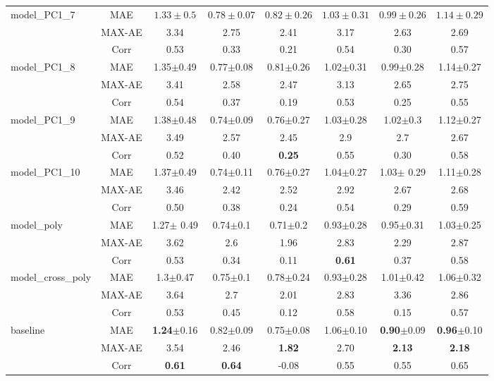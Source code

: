 \begin{table}[t]
\begin{center}
\begin{tabular}{lc||c|c|c|c|c|c}
			\hline
			model\_PC1\_7&MAE &$1.33\pm{0.5}$&$0.78\pm{0.07}$&$0.82\pm{0.26}$&$1.03\pm{0.31}$&$0.99\pm{0.26}$&$1.14\pm{0.29}$\\
			&MAX-AE &3.34&2.75&2.41&3.17&2.63&2.69\\
			&Corr &0.53&0.33&0.21&0.54&0.30&0.57\\
			
			\hline
			model\_PC1\_8&MAE & 1.35$\pm$0.49 & 0.77$\pm$0.08& 0.81$\pm$0.26&1.02$\pm$0.31& 0.99$\pm$0.28 & 1.14$\pm$0.27\\
			&MAX-AE &3.41&2.58&2.47&3.13&2.65&2.75\\
			&Corr &0.54&0.37&0.19&0.53&0.25&0.55\\
			
			\hline
			model\_PC1\_9&MAE & 1.38$\pm$0.48 & 0.74$\pm$0.09 & 0.76$\pm$0.27 & 1.03$\pm$0.28 & 1.02$\pm$0.3 & 1.12$\pm$0.27\\
			&MAX-AE &3.49&2.57&2.45&2.9&2.7&2.67\\
			&Corr &0.52&0.40&\textbf{0.25}&0.55&0.30&0.58\\
			
			\hline
			model\_PC1\_10&MAE & 1.37$\pm$0.49 & 0.74$\pm$0.11 & 0.76$\pm$0.27 & 1.04$\pm$0.27 & 1.03$\pm$ 0.29& 1.11$\pm$0.28\\
			&MAX-AE &3.46&2.42&2.52&2.92&2.67&2.68\\
			&Corr &0.50&0.38&0.24&0.54&0.29&0.59\\
			
			\hline
			model\_poly&MAE & 1.27$\pm$ 0.49 & 0.74$\pm$0.1 & 0.71$\pm$0.2 & 0.93$\pm$0.28 & 0.95$\pm$0.31 & 1.03$\pm$0.25\\
			&MAX-AE &3.62&2.6&1.96&2.83&2.29&2.87\\
			&Corr &0.53&0.34&0.11&\textbf{0.61}&0.37&0.58\\
			
			\hline
			model\_cross\_poly&MAE & 1.3$\pm$0.47 & 0.75$\pm$0.1 & 0.78$\pm$0.24 & 0.93$\pm$0.28 & 1.01$\pm$0.42 & 1.06$\pm$0.32 \\
			&MAX-AE &3.64&2.7&2.01&2.83&3.36&2.86\\
			&Corr &0.53&0.45&0.12&0.58&0.15&0.57\\
			\hline  \hline
			
			baseline& MAE & \textbf{1.24}$\pm$0.16 & 0.82$\pm$0.09 & 0.75$\pm$0.08 & 1.06$\pm$0.10 & \textbf{0.90}$\pm$0.09 & \textbf{0.96}$\pm$0.10 \\
			&MAX-AE & 3.54 & 2.46 & \textbf{1.82} & 2.70 & \textbf{2.13} & \textbf{2.18}\\
			&Corr   & \textbf{0.61} & \textbf{0.64} &-0.08 & 0.55 & 0.55 & 0.65\\
			\hline
		\end{tabular}
	\end{center}
	\label{tab:H_testset}
\end{table}


